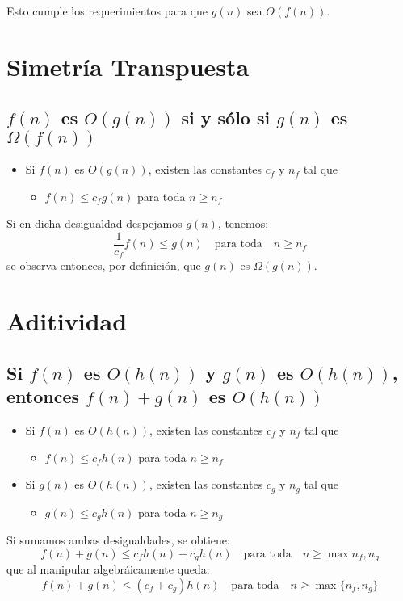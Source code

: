 \documentclass[letterpaper, 12pt]{article}
\begin{document}
\noindent
Esto cumple los requerimientos para que \(g(n)\) sea \(O(f(n))\).
\section{Simetría Transpuesta}
\label{sec:orgc1f3492}
\subsection{\(f(n)\) es \(O(g(n))\) si y sólo si \(g(n)\) es \(\Omega(f(n))\)}
\label{sec:org4b4a0c3}
\begin{itemize}
\item Si \(f(n)\) es \(O(g(n))\), existen las constantes \(c_f\) y \(n_f\) tal que
\begin{itemize}
\item \(f(n) \leq c_f g(n)\) para toda \(n \geq n_f\)
\end{itemize}
\end{itemize}

\noindent
Si en dicha desigualdad despejamos \(g(n)\), tenemos:
$$
\frac{1}{c_f} f(n) \leq g(n) \quad \mbox{para toda} \quad n \geq n_f
$$
se observa entonces, por definición, que \(g(n)\) es \(\Omega(g(n))\).
\section{Aditividad}
\label{sec:orgc3c608e}
\subsection{Si \(f(n)\) es \(O(h(n))\) y \(g(n)\) es \(O(h(n))\), entonces \(f(n)+g(n)\) es \(O(h(n))\)}
\label{sec:orga56e7a1}
\begin{itemize}
\item Si \(f(n)\) es \(O(h(n))\), existen las constantes \(c_f\) y \(n_f\) tal que
\begin{itemize}
\item \(f(n) \leq c_f h(n)\) para toda \(n \geq n_f\)
\end{itemize}
\item Si \(g(n)\) es \(O(h(n))\), existen las constantes \(c_g\) y \(n_g\) tal que
\begin{itemize}
\item \(g(n) \leq c_g h(n)\) para toda \(n \geq n_g\)
\end{itemize}
\end{itemize}

\noindent
Si sumamos ambas desigualdades, se obtiene:
$$
f(n) + g(n) \leq c_f h(n) + c_g h(n) \quad \mbox{para toda} \quad
n \geq \max{n_f, n_g}
$$
que al manipular algebráicamente queda:
$$
f(n) + g(n) \leq (c_f + c_g) h(n) \quad \mbox{para toda} \quad
n \geq \max\{n_f, n_g\}
$$
\end{document}
